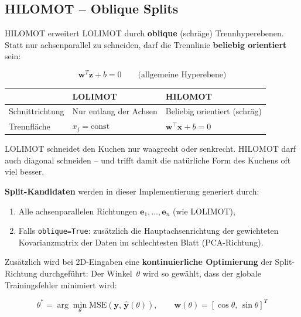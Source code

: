 \documentclass[11pt,a4paper]{report}
\begin{document}
	\subsection{HILOMOT -- Oblique Splits}
	
	HILOMOT erweitert LOLIMOT durch \textbf{oblique} (schräge) Trennhyperebenen. Statt nur achsenparallel zu schneiden, darf die Trennlinie \textbf{beliebig orientiert} sein:
	
	\begin{equation}
		\mathbf{w}^T \mathbf{z} + b = 0 \qquad \text{(allgemeine Hyperebene)}
	\end{equation}
	
	\begin{center}
		\begin{tabular}{lll}
			\toprule
			& \textbf{LOLIMOT} & \textbf{HILOMOT} \\  \midrule
			Schnittrichtung & Nur entlang der Achsen & Beliebig orientiert (schräg) \\
			Trennfläche & $x_j = \mathrm{const}$ & $\mathbf{w}^\top \mathbf{x} + b = 0$ \\
			\bottomrule
		\end{tabular}
	\end{center}
	
	\begin{analogiebox}
		LOLIMOT schneidet den Kuchen nur waagrecht oder senkrecht. HILOMOT darf auch diagonal schneiden -- und trifft damit die natürliche Form des Kuchens oft viel besser.
	\end{analogiebox}
	
	\textbf{Split-Kandidaten} werden in dieser Implementierung generiert durch:
	\begin{enumerate}
		\item Alle achsenparallelen Richtungen $\mathbf{e}_1, \ldots, \mathbf{e}_n$ (wie LOLIMOT),
		\item Falls \texttt{oblique=True}: zusätzlich die Hauptachsenrichtung der gewichteten Kovarianzmatrix der Daten im schlechtesten Blatt (PCA-Richtung).
	\end{enumerate}
	
	Zusätzlich wird bei 2D-Eingaben eine \textbf{kontinuierliche Optimierung} der Split-Richtung durchgeführt: Der Winkel~$\theta$ wird so gewählt, dass der globale Trainingsfehler minimiert wird:
	
	\begin{equation}
		\theta^* = \arg\min_\theta \mathrm{MSE}\left(\mathbf{y},\, \hat{\mathbf{y}}(\theta)\right),
		\qquad \mathbf{w}(\theta) = [\cos\theta,\, \sin\theta]^T
	\end{equation}
	
\end{document}
